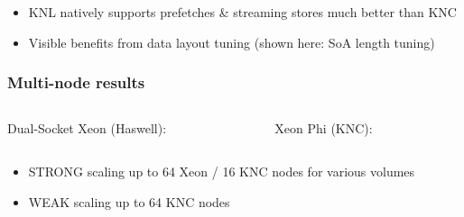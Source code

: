 \documentclass{beamer}
\begin{document}
\begin{frame}
\begin{columns}[T]
\begin{column}{.5\textwidth}
\begin{center}
        \end{center}
      \end{column}
    \end{columns}

    \begin{itemize}
      \item KNL natively supports prefetches \& streaming stores much better than KNC
        \vfill
      \item Visible benefits from data layout tuning (shown here: SoA length tuning)
        \vfill
    \end{itemize}

  \end{frame}


  \begin{frame}
    \frametitle{Multi-node results}
    \footnotesize

    \begin{columns}[T]
      \begin{column}{.5\textwidth}
        \begin{center}
          Dual-Socket Xeon (Haswell):\\
          \vfill
        \end{center}
      \end{column}
      \begin{column}{.5\textwidth}
        \begin{center}
          Xeon Phi (KNC):\\
          \vfill
        \end{center}
      \end{column}
    \end{columns}

    \bigskip

    \begin{itemize}
      \item STRONG scaling up to 64 Xeon / 16 KNC nodes for various volumes
        \vfill
      \item WEAK scaling up to 64 KNC nodes
        \vfill
    \end{itemize}

  \end{frame}
\end{document}
